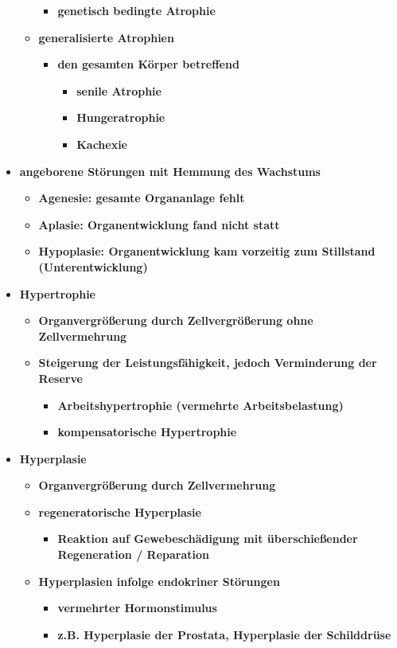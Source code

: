 \begin{itemize}
\begin{itemize}
\begin{itemize}
						\item \textbf{genetisch bedingte Atrophie}
					\end{itemize}
				\item \textbf{generalisierte Atrophien}
					\begin{itemize}
						\item \textbf{den gesamten Körper betreffend}
							\begin{itemize}
								\item \textbf{senile Atrophie}
								\item \textbf{Hungeratrophie}
								\item \textbf{Kachexie}
							\end{itemize}
				\end{itemize}
		\end{itemize}
		\item \textbf{angeborene Störungen mit Hemmung des Wachstums}
			\begin{itemize}
				\item \textbf{Agenesie: gesamte Organanlage fehlt}
				\item \textbf{Aplasie: Organentwicklung fand nicht statt}
				\item \textbf{Hypoplasie: Organentwicklung kam vorzeitig zum Stillstand (Unterentwicklung)}
			\end{itemize}
		\item \textbf{Hypertrophie}
			\begin{itemize}
				\item \textbf{Organvergrößerung durch Zellvergrößerung ohne Zellvermehrung}
				\item \textbf{Steigerung der Leistungsfähigkeit, jedoch Verminderung der Reserve}
					\begin{itemize}
						\item \textbf{Arbeitshypertrophie (vermehrte Arbeitsbelastung)}
						\item \textbf{kompensatorische Hypertrophie}
					\end{itemize}
			\end{itemize}
		\item \textbf{Hyperplasie}
			\begin{itemize}
				\item \textbf{Organvergrößerung durch Zellvermehrung}
				\item \textbf{regeneratorische Hyperplasie}
					\begin{itemize}
						\item \textbf{Reaktion auf Gewebeschädigung mit überschießender Regeneration / Reparation}
					\end{itemize}
				\item \textbf{Hyperplasien infolge endokriner Störungen}
					\begin{itemize}
						\item \textbf{vermehrter Hormonstimulus}
						\item \textbf{z.B. Hyperplasie der Prostata, Hyperplasie der Schilddrüse}
					\end{itemize}
			\end{itemize}
	\end{itemize}

